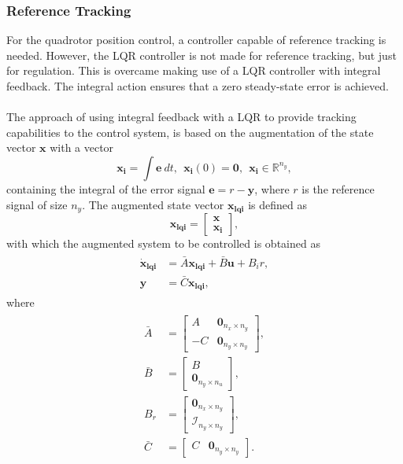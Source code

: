 \subsubsection{Reference Tracking}
For the quadrotor position control, a controller capable of reference tracking is needed. However, the LQR controller is not made for reference tracking, but just for regulation. This is overcame making use of a LQR controller with integral feedback. The integral action ensures that a zero steady-state error is achieved. 
\\\\
The approach of using integral feedback with a LQR to provide tracking capabilities to the control system, is based on the augmentation of the state vector $\mathbf{x}$ with a vector
\begin{equation}
\mathbf{x_i} = \int \mathbf{e}\ dt,\ \ \mathbf{x_i}(0) = \mathbf{0},\ \ \mathbf{x_i} \in \mathbb{R}^{n_y},
\end{equation}
containing the integral of the error signal $\mathbf{e} = r - \mathbf{y}$, where $r$ is the reference signal of size $n_y$. The augmented state vector $\mathbf{x_{lqi}}$ is defined as
\begin{equation}
\mathbf{x_{lqi}} = \begin{bmatrix}
\mathbf{x} \\
\mathbf{x_i}
\end{bmatrix},
\end{equation}
with which the augmented system to be controlled is obtained as
\begin{align}
\label{eqn:augmentedLQI}
\begin{split}
\mathbf{\dot{x}_{lqi}} & = \bar{A}\mathbf{x_{lqi}} + \bar{B}\mathbf{u} + B_{i}r,\\[5px]
\mathbf{y} & = \bar{C}\mathbf{x_{lqi}},
\end{split}
\end{align}
where
\begin{align}
\begin{split}
\bar{A} & = \begin{bmatrix}
A & \mathbf{0_{\mathit{n_x}\times \mathit{n_y}}} \\
-C & \mathbf{0_{\mathit{n_y}\times \mathit{n_y}}}
\end{bmatrix}, \\[5px]
\bar{B} & = \begin{bmatrix}
B \\ \mathbf{0_{\mathit{n_y}\times \mathit{n_u}}}
\end{bmatrix}, \\[5px]
B_{r} & = \begin{bmatrix}
\mathbf{0_{\mathit{n_x}\times \mathit{n_y}}} \\
\mathcal{I}_{\mathit{n_y}\times \mathit{n_y}}
\end{bmatrix}, \\[5px]
\bar{C} & = \begin{bmatrix}
C & \mathbf{0_{\mathit{n_y}\times \mathit{n_y}}}
\end{bmatrix}.
\end{split}
\end{align}
